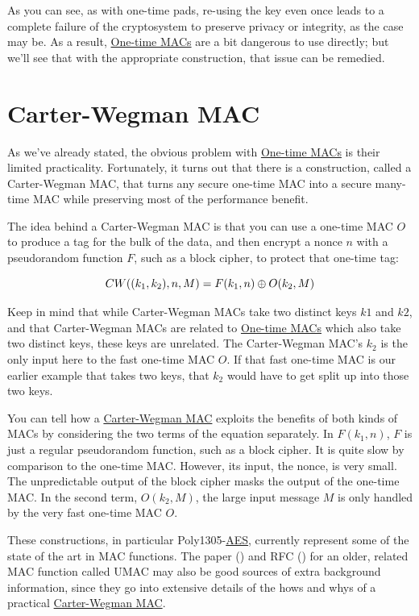 \documentclass[11pt,ebook,table,dvipsnames]{memoir}
\begin{document}
As you can see, as with one-time pads, re-using the key even once
leads to a complete failure of the cryptosystem to preserve privacy or
integrity, as the case may be. As a result, \hyperref[one-time-MACs]{One-time MACs} are a bit
dangerous to use directly; but we'll see that with the appropriate
construction, that issue can be remedied.
\section{\label{Carter-Wegman-MAC}Carter-Wegman MAC}
\label{sec-2-7-6}

As we've already stated, the obvious problem with \hyperref[one-time-MACs]{One-time MACs} is
their limited practicality. Fortunately, it turns out that there is a
construction, called a \gls{Carter-Wegman MAC}, that turns any secure
one-time MAC into a secure many-time MAC while preserving most of the
performance benefit.

The idea behind a \gls{Carter-Wegman MAC} is that you can use a
one-time MAC $O$ to produce a tag for the bulk of the data, and then
encrypt a nonce $n$ with a pseudorandom function $F$, such as a block
cipher, to protect that one-time tag:

\[
CW((k_1, k_2), n, M) = F(k_1, n) \oplus O(k_2, M)
\]

Keep in mind that while Carter-Wegman MACs take two distinct keys $k1$
and $k2$, and that Carter-Wegman MACs are related to \hyperref[one-time-MACs]{One-time MACs}
which also take two distinct keys, these keys are unrelated. The
Carter-Wegman MAC's $k_2$ is the only input here to the fast one-time
MAC $O$. If that fast one-time MAC is our earlier example that takes
two keys, that $k_2$ would have to get split up into those two keys.

You can tell how a \hyperref[Carter-Wegman-MAC]{Carter-Wegman MAC} exploits the benefits of both
kinds of MACs by considering the two terms of the equation separately.
In $F(k_1, n)$, $F$ is just a regular pseudorandom function, such as a
block cipher. It is quite slow by comparison to the one-time MAC.
However, its input, the nonce, is very small. The unpredictable output
of the block cipher masks the output of the one-time MAC. In the
second term, $O(k_2, M)$, the large input message $M$ is only handled
by the very fast one-time MAC $O$.

These constructions, in particular Poly1305-\hyperref[AES]{AES}, currently represent
some of the state of the art in MAC functions. The paper (\cite{umac})
and RFC (\cite{rfc4418}) for an older, related MAC function called
UMAC may also be good sources of extra background information, since
they go into extensive details of the hows and whys of a practical
\hyperref[Carter-Wegman-MAC]{Carter-Wegman MAC}.
\end{document}
